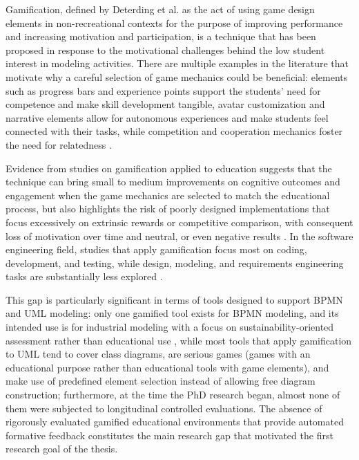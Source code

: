 Gamification, defined by Deterding et al. \cite{deterding_game_2011} as the act of using game design elements in non-recreational contexts for the purpose of improving performance and increasing motivation and participation, is a technique that has been proposed in response to the motivational challenges behind the low student interest in modeling activities. There are multiple examples in the literature that motivate why a careful selection of game mechanics could be beneficial: elements such as progress bars and experience points support the students' need for competence and make skill development tangible, avatar customization and narrative elements allow for autonomous experiences and make students feel connected with their tasks, while competition and cooperation mechanics foster the need for relatedness \cite{deci2000intrinsic}. 

Evidence from studies on gamification applied to education suggests that the technique can bring small to medium improvements on cognitive outcomes and engagement when the game mechanics are selected to match the educational process, but also highlights the risk of poorly designed implementations that focus excessively on extrinsic rewards or competitive comparison, with consequent loss of motivation over time and neutral, or even negative results \cite{hamari2014does, sailer2020gamification, hanus2015assessing}. In the software engineering field, studies that apply gamification focus most on coding, development, and testing, while design, modeling, and requirements engineering tasks are substantially less explored \cite{pedreira2015gamification}.

This gap is particularly significant in terms of tools designed to support BPMN and UML modeling: only one gamified tool exists for BPMN modeling, and its intended use is for industrial modeling with a focus on sustainability-oriented assessment rather than educational use \cite{mancebo_bpms-game_2017}, while most tools that apply gamification to UML tend to cover class diagrams, are serious games (games with an educational purpose rather than educational tools with game elements), and make use of predefined element selection instead of allowing free diagram construction; furthermore, at the time the PhD research began, almost none of them were subjected to longitudinal controlled evaluations. The absence of rigorously evaluated gamified educational environments that provide automated formative feedback constitutes the main research gap that motivated the first research goal of the thesis.

